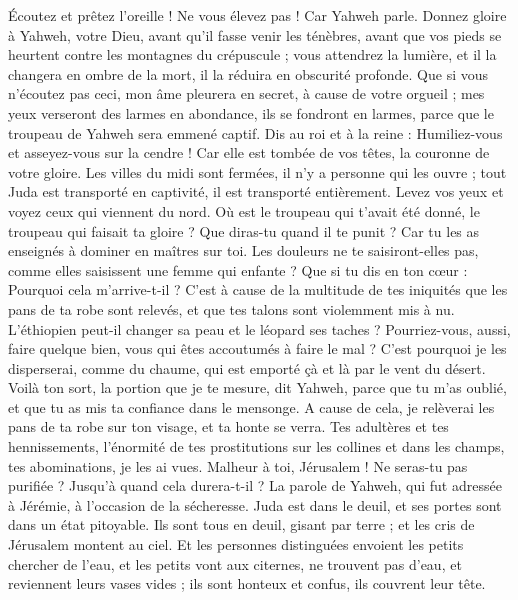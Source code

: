 \begin{multicols}{2}
Écoutez et prêtez l'oreille ! Ne vous élevez pas ! Car Yahweh parle.
Donnez gloire à Yahweh, votre Dieu, avant qu'il fasse venir les ténèbres, avant que vos pieds se heurtent contre les montagnes du crépuscule ; vous attendrez la lumière, et il la changera en ombre de la mort, il la réduira en obscurité profonde.
Que si vous n'écoutez pas ceci, mon âme pleurera en secret, à cause de votre orgueil ; mes yeux verseront des larmes en abondance, ils se fondront en larmes, parce que le troupeau de Yahweh sera emmené captif.
Dis au roi et à la reine : Humiliez-vous et asseyez-vous sur la cendre ! Car elle est tombée de vos têtes, la couronne de votre gloire.
Les villes du midi sont fermées, il n'y a personne qui les ouvre ; tout Juda est transporté en captivité, il est transporté entièrement.
Levez vos yeux et voyez ceux qui viennent du nord. Où est le troupeau qui t'avait été donné, le troupeau qui faisait ta gloire ?
Que diras-tu quand il te punit ? Car tu les as enseignés à dominer en maîtres sur toi. Les douleurs ne te saisiront-elles pas, comme elles saisissent une femme qui enfante ?
Que si tu dis en ton cœur : Pourquoi cela m'arrive-t-il ? C'est à cause de la multitude de tes iniquités que les pans de ta robe sont relevés, et que tes talons sont violemment mis à nu.
L'éthiopien peut-il changer sa peau et le léopard ses taches ? Pourriez-vous, aussi, faire quelque bien, vous qui êtes accoutumés à faire le mal ?
C'est pourquoi je les disperserai, comme du chaume, qui est emporté çà et là par le vent du désert.
Voilà ton sort, la portion que je te mesure, dit Yahweh, parce que tu m'as oublié, et que tu as mis ta confiance dans le mensonge.
A cause de cela, je relèverai les pans de ta robe sur ton visage, et ta honte se verra.
Tes adultères et tes hennissements, l'énormité de tes prostitutions sur les collines et dans les champs, tes abominations, je les ai vues. Malheur à toi, Jérusalem ! Ne seras-tu pas purifiée ? Jusqu'à quand cela durera-t-il ?
\VerseOne{}La parole de Yahweh, qui fut adressée à Jérémie, à l'occasion de la sécheresse.
Juda est dans le deuil, et ses portes sont dans un état pitoyable. Ils sont tous en deuil, gisant par terre ; et les cris de Jérusalem montent au ciel.
Et les personnes distinguées envoient les petits chercher de l'eau, et les petits vont aux citernes, ne trouvent pas d'eau, et reviennent leurs vases vides ; ils sont honteux et confus, ils couvrent leur tête.

\end{multicols}
